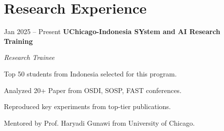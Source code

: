 \section{Research Experience}

\begin{twocolentry}{
    Jan 2025 – Present
}
\textbf{UChicago-Indonesia SYstem and AI Research Training}\end{twocolentry}
\textit{Research Trainee}

\vspace{0.10 cm}
\begin{onecolentry}
    \begin{highlights}
        \item Top 50 students from Indonesia selected for this program.
        \item Analyzed 20+ Paper from OSDI, SOSP, FAST conferences.
        \item Reproduced key experiments from top-tier publications.
        \item Mentored by Prof. Haryadi Gunawi from University of Chicago.
    \end{highlights}
\end{onecolentry}
